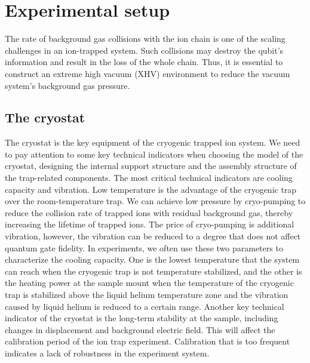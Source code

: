 
\chapter{Experimental setup}

The rate of background gas collisions with the ion chain is one of the scaling challenges in an ion-trapped system. Such collisions may destroy the qubit's information and result in the loss of the whole chain. Thus, it is essential to construct an extreme high vacuum (XHV) environment to reduce the vacuum system's background gas pressure.



\section{The cryostat}

The cryostat is the key equipment of the cryogenic trapped ion system. We need to pay attention to some key technical indicators when choosing the model of the cryostat, designing the internal support structure and the assembly structure of the trap-related components. The most critical technical indicators are cooling capacity and vibration. Low temperature is the advantage of the cryogenic trap over the room-temperature trap. We can achieve low pressure by cryo-pumping to reduce the collision rate of trapped ions with residual background gas, thereby increasing the lifetime of trapped ions. The price of cryo-pumping is additional vibration, however, the vibration can be reduced to a degree that does not affect quantum gate fidelity. In experiments, we often use these two parameters to characterize the cooling capacity. One is the lowest temperature that the system can reach when the cryogenic trap is not temperature stabilized, and the other is the heating power at the sample mount when the temperature of the cryogenic trap is stabilized above the liquid helium temperature zone and the vibration caused by liquid helium is reduced to a certain range. Another key technical indicator of the cryostat is the long-term stability at the sample, including changes in displacement and background electric field. This will affect the calibration period of the ion trap experiment. Calibration that is too frequent indicates a lack of robustness in the experiment system.

